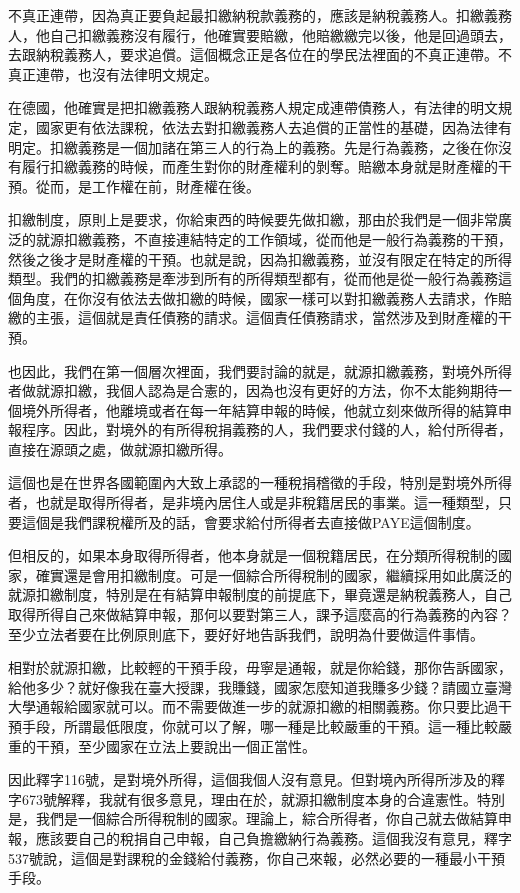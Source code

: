 \documentclass[]{ctexbook}
\begin{document}
不真正連帶，因為真正要負起最扣繳納稅款義務的，應該是納稅義務人。扣繳義務人，他自己扣繳義務沒有履行，他確實要賠繳，他賠繳繳完以後，他是回過頭去，去跟納稅義務人，要求追償。這個概念正是各位在的學民法裡面的不真正連帶。不真正連帶，也沒有法律明文規定。

在德國，他確實是把扣繳義務人跟納稅義務人規定成連帶債務人，有法律的明文規定，國家更有依法課稅，依法去對扣繳義務人去追償的正當性的基礎，因為法律有明定。扣繳義務是一個加諸在第三人的行為上的義務。先是行為義務，之後在你沒有履行扣繳義務的時候，而產生對你的財產權利的剝奪。賠繳本身就是財產權的干預。從而，是工作權在前，財產權在後。

扣繳制度，原則上是要求，你給東西的時候要先做扣繳，那由於我們是一個非常廣泛的就源扣繳義務，不直接連結特定的工作領域，從而他是一般行為義務的干預，然後之後才是財產權的干預。也就是說，因為扣繳義務，並沒有限定在特定的所得類型。我們的扣繳義務是牽涉到所有的所得類型都有，從而他是從一般行為義務這個角度，在你沒有依法去做扣繳的時候，國家一樣可以對扣繳義務人去請求，作賠繳的主張，這個就是責任債務的請求。這個責任債務請求，當然涉及到財產權的干預。

也因此，我們在第一個層次裡面，我們要討論的就是，就源扣繳義務，對境外所得者做就源扣繳，我個人認為是合憲的，因為也沒有更好的方法，你不太能夠期待一個境外所得者，他離境或者在每一年結算申報的時候，他就立刻來做所得的結算申報程序。因此，對境外的有所得稅捐義務的人，我們要求付錢的人，給付所得者，直接在源頭之處，做就源扣繳所得。

這個也是在世界各國範圍內大致上承認的一種稅捐稽徵的手段，特別是對境外所得者，也就是取得所得者，是非境內居住人或是非稅籍居民的事業。這一種類型，只要這個是我們課稅權所及的話，會要求給付所得者去直接做PAYE這個制度。

但相反的，如果本身取得所得者，他本身就是一個稅籍居民，在分類所得稅制的國家，確實還是會用扣繳制度。可是一個綜合所得稅制的國家，繼續採用如此廣泛的就源扣繳制度，特別是在有結算申報制度的前提底下，畢竟還是納稅義務人，自己取得所得自己來做結算申報，那何以要對第三人，課予這麼高的行為義務的內容？至少立法者要在比例原則底下，要好好地告訴我們，說明為什要做這件事情。

相對於就源扣繳，比較輕的干預手段，毋寧是通報，就是你給錢，那你告訴國家，給他多少？就好像我在臺大授課，我賺錢，國家怎麼知道我賺多少錢？請國立臺灣大學通報給國家就可以。而不需要做進一步的就源扣繳的相關義務。你只要比過干預手段，所謂最低限度，你就可以了解，哪一種是比較嚴重的干預。這一種比較嚴重的干預，至少國家在立法上要說出一個正當性。

因此釋字116號，是對境外所得，這個我個人沒有意見。但對境內所得所涉及的釋字673號解釋，我就有很多意見，理由在於，就源扣繳制度本身的合違憲性。特別是，我們是一個綜合所得稅制的國家。理論上，綜合所得者，你自己就去做結算申報，應該要自己的稅捐自己申報，自己負擔繳納行為義務。這個我沒有意見，釋字537號說，這個是對課稅的金錢給付義務，你自己來報，必然必要的一種最小干預手段。
\end{document}
